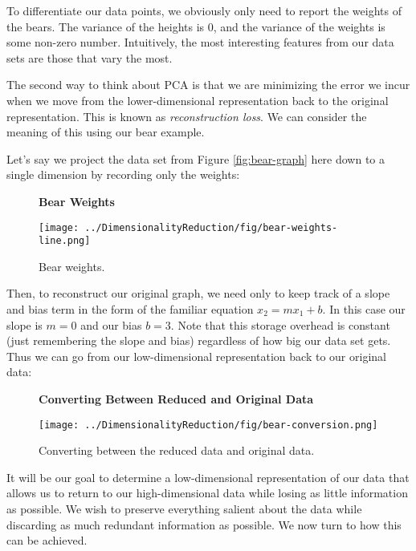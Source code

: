 To differentiate our data points, we obviously only need to report the weights of the bears. The variance of the heights is 0, and the variance of the weights is some non-zero number. Intuitively, the most interesting features from our data sets are those that vary the most.


The second way to think about PCA is that we are minimizing the error we incur when we move from the lower-dimensional representation back to the original representation. This is known as \textit{reconstruction loss}. We can consider the meaning of this using our bear example.

Let's say we project the data set from Figure \ref{fig:bear-graph} here down to a single dimension by recording only the weights:

\begin{figure}
    \centering
    \textbf{Bear Weights}\par\medskip
    \texttt{[image: ../DimensionalityReduction/fig/bear-weights-line.png]}
    \caption{Bear weights.}
    \label{fig:bear-weights-line}
\end{figure}

Then, to reconstruct our original graph, we need only to keep track of a slope and bias term in the form of the familiar equation $x_2 = mx_1 + b$. In this case our slope is $m=0$ and our bias $b=3$. Note that this storage overhead is constant (just remembering the slope and bias) regardless of how big our data set gets. Thus we can go from our low-dimensional representation back to our original data:

\begin{figure}
    \centering
    \textbf{Converting Between Reduced and Original Data}\par\medskip
    \texttt{[image: ../DimensionalityReduction/fig/bear-conversion.png]}
    \caption{Converting between the reduced data and original data.}
    \label{fig:bear-conversion}
\end{figure}

It will be our goal to determine a low-dimensional representation of our data that allows us to return to our high-dimensional data while losing as little information as possible. We wish to preserve everything salient about the data while discarding as much redundant information as possible. We now turn to how this can be achieved.

